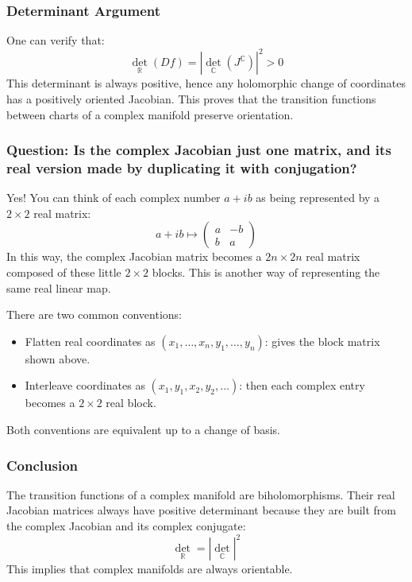 \subsubsection*{Determinant Argument}

One can verify that:
\[
\det_{\mathbb{R}}(Df) = \left| \det_{\mathbb{C}}(J^{\mathbb{C}}) \right|^2 > 0
\]
This determinant is always positive, hence any holomorphic change of coordinates has a positively oriented Jacobian. This proves that the transition functions between charts of a complex manifold preserve orientation.

\subsubsection*{Question: Is the complex Jacobian just one matrix, and its real version made by duplicating it with conjugation?}

Yes! You can think of each complex number \( a + ib \) as being represented by a \(2 \times 2\) real matrix:
\[
a + ib \mapsto \begin{pmatrix}
a & -b \\
b & a
\end{pmatrix}
\]
In this way, the complex Jacobian matrix becomes a \(2n \times 2n\) real matrix composed of these little \(2 \times 2\) blocks. This is another way of representing the same real linear map.

There are two common conventions:
\begin{itemize}
    \item Flatten real coordinates as \( (x_1, \dots, x_n, y_1, \dots, y_n) \): gives the block matrix shown above.
    \item Interleave coordinates as \( (x_1, y_1, x_2, y_2, \dots) \): then each complex entry becomes a \(2 \times 2\) real block.
\end{itemize}

Both conventions are equivalent up to a change of basis.

\subsubsection*{Conclusion}

The transition functions of a complex manifold are biholomorphisms. Their real Jacobian matrices always have positive determinant because they are built from the complex Jacobian and its complex conjugate:
\[
\det_{\mathbb{R}} = |\det_{\mathbb{C}}|^2
\]
This implies that complex manifolds are always orientable.

